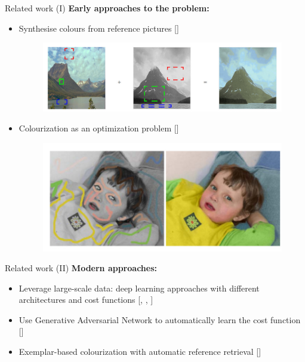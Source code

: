 \documentclass{beamer}
\begin{document}
\begin{frame}{Related work (I)}
  \textbf{Early approaches to the problem:}

    \medskip

    \begin{itemize}
      \item Synthesise colours from reference pictures [\cite{Welsh2002}]

      \begin{figure}[!htb]
          \includegraphics[width=\linewidth]{resources/welsh.jpg}
        \endminipage
      \end{figure}

      \medskip

      \item Colourization as an optimization problem [\cite{Levin2004}]

      \begin{figure}[!htb]
          \includegraphics[width=\linewidth]{resources/levin.jpg}
        \endminipage
      \end{figure}
    \end{itemize}
\end{frame}

\begin{frame}{Related work (II)}
  \textbf{Modern approaches:}
    \begin{itemize}
      \item Leverage large-scale data: deep learning approaches with different
            architectures and cost functions [\cite{Larsson2016},
            \cite{Iizuka2016}, \cite{Zhang2016}]
      \item Use Generative Adversarial Network to automatically learn the cost
            function [\cite{Nazeri2018}]
      \item Exemplar-based colourization with automatic reference retrieval
            [\cite{He2018}]
    \end{itemize}
\end{frame}
\end{document}
